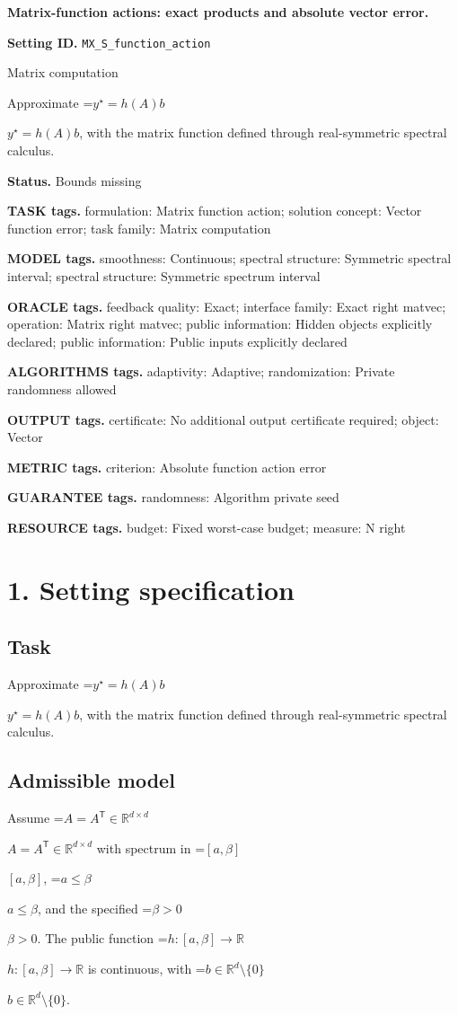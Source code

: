 \documentclass[10pt,a4paper]{article}
\newcommand{\AtlasMath}[1]{\par\begingroup\centering\setbox0=\hbox{$\displaystyle #1$}\ifdim\wd0>1.4\linewidth\typeout{ATLAS WIDE FORMULA: \the\wd0}\fi\ifdim\wd0>\linewidth\resizebox{\linewidth}{!}{\box0}\else\box0\fi\par\endgroup}
\newcommand{\AtlasInlineMath}[1]{\begingroup\setbox0=\hbox{$#1$}\ifdim\wd0>.4\linewidth\endgroup\AtlasMath{#1}\else\endgroup$#1$\fi}
\begin{document}
\raggedright

{\LARGE\bfseries\sffamily\color{AtlasNavy} Matrix-function actions: exact products and absolute vector error.\par}\vspace{5pt}
\textbf{Setting ID.} \texttt{MX\_\allowbreak{}S\_\allowbreak{}function\_\allowbreak{}action}

Matrix computation

Approximate \AtlasInlineMath{y^\star=h(A)b}, with the matrix function defined through real-symmetric spectral calculus.

\textbf{Status.} Bounds missing

\textbf{TASK tags.} formulation: Matrix function action; solution concept: Vector function error; task family: Matrix computation

\textbf{MODEL tags.} smoothness: Continuous; spectral structure: Symmetric spectral interval; spectral structure: Symmetric spectrum interval

\textbf{ORACLE tags.} feedback quality: Exact; interface family: Exact right matvec; operation: Matrix right matvec; public information: Hidden objects explicitly declared; public information: Public inputs explicitly declared

\textbf{ALGORITHMS tags.} adaptivity: Adaptive; randomization: Private randomness allowed

\textbf{OUTPUT tags.} certificate: No additional output certificate required; object: Vector

\textbf{METRIC tags.} criterion: Absolute function action error

\textbf{GUARANTEE tags.} randomness: Algorithm private seed

\textbf{RESOURCE tags.} budget: Fixed worst-case budget; measure: N right

\section{1. Setting specification}
\subsection{Task}
Approximate \AtlasInlineMath{y^\star=h(A)b}, with the matrix function defined through real-symmetric spectral calculus.

\subsection{Admissible model}
Assume \AtlasInlineMath{A=A^{\mathsf T}\in\mathbb{R}^{d\times d}} with spectrum in \AtlasInlineMath{[a,\beta]}, \AtlasInlineMath{a\le\beta}, and the specified \AtlasInlineMath{\beta>0}. The public function \AtlasInlineMath{h:[a,\beta]\to\mathbb{R}} is continuous, with \AtlasInlineMath{b\in\mathbb{R}^d\setminus\{0\}}.
\end{document}
